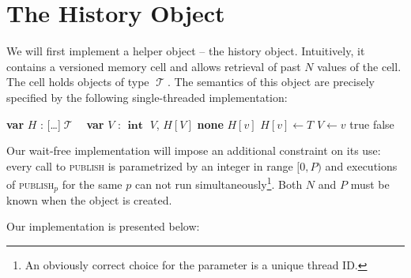 \documentclass[a4paper,11pt]{article}
\def\none{\textbf{none} }
\def\T{\ensuremath{\operatorname{\mathcal{T}}}\text{ }}
\def\int{\ensuremath{\operatorname{\textbf{int}}}}
\newcommand{\fn}[1]{\textsc{#1}}
\newcommand{\var}[2]{\textbf{var }#1 : #2}
\newcommand{\arrayspec}[1]{\text{array}[#1]\text{ of }}
\begin{document}

\section{The History Object}

We will first implement a helper object -- the history object. Intuitively, it contains a versioned memory cell and allows retrieval of past $N$ values of the cell. The cell holds objects of type \T. The semantics of this object are precisely specified by the following single-threaded implementation:
\begin{algorithmic}[1]
	\filbreak
	\State\var{$H$}{\arrayspec{\ldots}$\T$}
	\State\var{$V$}{\int} %
	\filbreak
		\State \Return $V$, $H[V]$
	\EndFunction
	\filbreak
			\State \Return \none
		\Else
		\State \Return $H[v]$
		\EndIf
	\EndFunction
	\filbreak
			\State $H[v] \gets T$
			\State $V \gets v$
			\State \Return true
		\Else
			\State \Return false
		\EndIf
	\EndFunction
\end{algorithmic}


Our wait-free implementation will impose an additional constraint on its use: every call to \fn{publish} is parametrized by an integer in range $[0,P)$ and executions of \fn{publish$_p$} for the same $p$ can not run simultaneously\footnote{An obviously correct choice for the parameter is a unique thread ID.}.
	Both $N$ and $P$ must be known when the object is created.

Our implementation is presented below:
\end{document}
